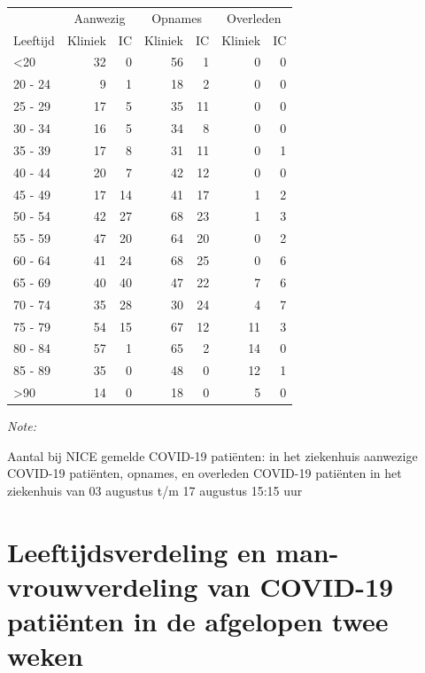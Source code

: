\documentclass[
  english,
  man,floatsintext]{apa6}
\begin{document}
\begin{table}
\centering\begingroup\fontsize{10}{12}\selectfont

\begin{threeparttable}
\begin{tabular}{lrrrrrr}
\toprule
\multicolumn{1}{c}{ } & \multicolumn{2}{c}{Aanwezig} & \multicolumn{2}{c}{Opnames} & \multicolumn{2}{c}{Overleden} \\
\cmidrule(l{3pt}r{3pt}){2-3} \cmidrule(l{3pt}r{3pt}){4-5} \cmidrule(l{3pt}r{3pt}){6-7}
Leeftijd & Kliniek & IC & Kliniek & IC & Kliniek & IC\\
\midrule
<20 & 32 & 0 & 56 & 1 & 0 & 0\\
20 - 24 & 9 & 1 & 18 & 2 & 0 & 0\\
25 - 29 & 17 & 5 & 35 & 11 & 0 & 0\\
30 - 34 & 16 & 5 & 34 & 8 & 0 & 0\\
35 - 39 & 17 & 8 & 31 & 11 & 0 & 1\\
40 - 44 & 20 & 7 & 42 & 12 & 0 & 0\\
45 - 49 & 17 & 14 & 41 & 17 & 1 & 2\\
50 - 54 & 42 & 27 & 68 & 23 & 1 & 3\\
55 - 59 & 47 & 20 & 64 & 20 & 0 & 2\\
60 - 64 & 41 & 24 & 68 & 25 & 0 & 6\\
65 - 69 & 40 & 40 & 47 & 22 & 7 & 6\\
70 - 74 & 35 & 28 & 30 & 24 & 4 & 7\\
75 - 79 & 54 & 15 & 67 & 12 & 11 & 3\\
80 - 84 & 57 & 1 & 65 & 2 & 14 & 0\\
85 - 89 & 35 & 0 & 48 & 0 & 12 & 1\\
>90 & 14 & 0 & 18 & 0 & 5 & 0\\
\bottomrule
\end{tabular}
\begin{tablenotes}
\item \textit{Note: } 
\item Aantal bij NICE gemelde COVID-19 patiënten: in het ziekenhuis aanwezige COVID-19 patiënten, opnames, en overleden COVID-19 patiënten in het ziekenhuis van 03 augustus t/m 17 augustus 15:15 uur
\end{tablenotes}
\end{threeparttable}
\endgroup{}
\end{table}

\newpage

\hypertarget{leeftijdsverdeling-en-man-vrouwverdeling-van-covid-19-patiuxebnten-in-de-afgelopen-twee-weken}{%
\section{Leeftijdsverdeling en man-vrouwverdeling van COVID-19 patiënten in de afgelopen twee weken}\label{leeftijdsverdeling-en-man-vrouwverdeling-van-covid-19-patiuxebnten-in-de-afgelopen-twee-weken}}
\end{document}
